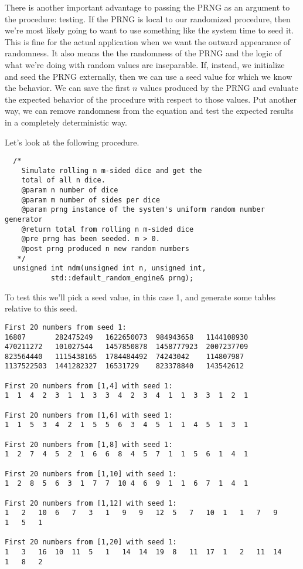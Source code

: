 \documentclass[]{tufte-handout}
\begin{document}
There is another important advantage to passing the PRNG as an argument to the procedure: testing. If the PRNG is local to our randomized procedure, then we're most likely going to want to use something like the system time to seed it. This is fine for the actual application when we want the outward appearance of randomness.  It also means the the randomness of the PRNG and the logic of what we're doing with random values are inseparable. If, instead, we initialize and seed the PRNG externally, then we can use a seed value for which we know the behavior. We can save the first $n$ values produced by the PRNG and evaluate the expected behavior of the procedure with respect to those values.  Put another way, we can remove randomness from the equation and test the expected results in a completely deterministic way.

Let's look at the following procedure.
\begin{verbatim}
  /*
    Simulate rolling n m-sided dice and get the
    total of all n dice.
    @param n number of dice
    @param m number of sides per dice
    @param prng instance of the system's uniform random number generator
    @return total from rolling n m-sided dice
    @pre prng has been seeded. m > 0.
    @post prng produced n new random numbers
   */
  unsigned int ndm(unsigned int n, unsigned int,
		   std::default_random_engine& prng);
\end{verbatim}

To test this we'll pick a seed value, in this case 1, and generate some tables relative to this seed.
\begin{verbatim}
First 20 numbers from seed 1:
16807       282475249   1622650073  984943658   1144108930
470211272   101027544   1457850878  1458777923  2007237709
823564440   1115438165  1784484492  74243042    114807987
1137522503  1441282327  16531729    823378840   143542612

First 20 numbers from [1,4] with seed 1:
1  1  4  2  3  1  1  3  3  4  2  3  4  1  1  3  3  1  2  1

First 20 numbers from [1,6] with seed 1:
1  1  5  3  4  2  1  5  5  6  3  4  5  1  1  4  5  1  3  1

First 20 numbers from [1,8] with seed 1:
1  2  7  4  5  2  1  6  6  8  4  5  7  1  1  5  6  1  4  1

First 20 numbers from [1,10] with seed 1:
1  2  8  5  6  3  1  7  7  10 4  6  9  1  1  6  7  1  4  1

First 20 numbers from [1,12] with seed 1:
1   2   10  6   7   3   1   9   9   12  5   7   10  1   1   7   9
1   5   1

First 20 numbers from [1,20] with seed 1:
1   3   16  10  11  5   1   14  14  19  8   11  17  1   2   11  14
1   8   2
\end{verbatim}
\end{document}

